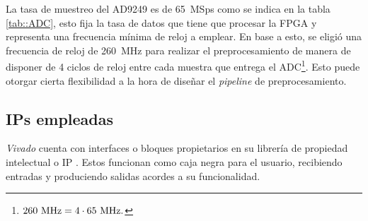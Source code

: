 \documentclass[../../main.tex]{subfiles}
\begin{document}
La tasa de muestreo del AD9249 es de 65~MSps como se indica en la tabla \ref{tab::ADC}, esto fija la tasa de datos que tiene que procesar la FPGA y representa una frecuencia mínima de reloj a emplear. En base a esto, se eligió una frecuencia de reloj de 260~MHz para realizar el preprocesamiento de manera de disponer de 4 ciclos de reloj entre cada muestra que entrega el ADC\footnote{$260~\textrm{MHz} = 4 \cdot 65~\textrm{MHz}.$}. Esto puede otorgar cierta flexibilidad a la hora de diseñar el \textit{pipeline} de preprocesamiento.

\subsection{IPs empleadas}
\textit{Vivado} cuenta con interfaces o bloques propietarios en su librería de propiedad intelectual o IP \cite{IP-Xilinx}. Estos funcionan como caja negra para el usuario, recibiendo entradas y produciendo salidas acordes a su funcionalidad.
\end{document}
